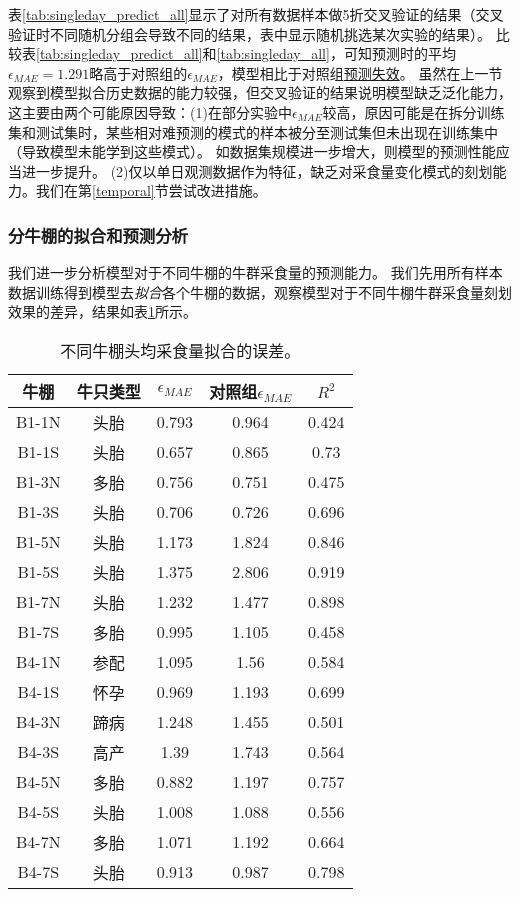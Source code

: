 表\ref{tab:singleday_predict_all}显示了对所有数据样本做5折交叉验证的结果（交叉验证时不同随机分组会导致不同的结果，表中显示随机挑选某次实验的结果）。
比较表\ref{tab:singleday_predict_all}和\ref{tab:singleday_all}，可知预测时的平均$\epsilon_{MAE}=1.291$略高于对照组的$\epsilon_{MAE}$，模型相比于对照组\uline{预测失效}。
虽然在上一节观察到模型拟合历史数据的能力较强，但交叉验证的结果说明模型缺乏泛化能力，这主要由两个可能原因导致：(1)在部分实验中$\epsilon_{MAE}$较高，原因可能是在拆分训练集和测试集时，某些相对难预测的模式的样本被分至测试集但未出现在训练集中（导致模型未能学到这些模式）。
如数据集规模进一步增大，则模型的预测性能应当进一步提升。
(2)仅以单日观测数据作为特征，缺乏对采食量变化模式的刻划能力。我们在第\ref{temporal}节尝试改进措施。



\subsubsection{分牛棚的拟合和预测分析}
\label{predict_singleday_cowshed}

我们进一步分析模型对于不同牛棚的牛群采食量的预测能力。
我们先用所有样本数据训练得到模型去\emph{拟合}各个牛棚的数据，观察模型对于不同牛棚牛群采食量刻划效果的差异，结果如表\ref{tab:regression_multicowshed}所示。

\begin{table}
\caption{不同牛棚头均采食量拟合的误差。}
\begin{center}
\footnotesize
\begin{tabular}{|c|c|c|c|c|}
\hline
	牛棚 & 牛只类型 & $\epsilon_{MAE}$ & 对照组$\epsilon_{MAE}$ &$R^2$ \\
\hline
B1-1N& 头胎 & 0.793 & 0.964 & 0.424 \\
B1-1S& 头胎 & 0.657 & 0.865 & 0.73 \\
B1-3N& 多胎 & 0.756 & 0.751 & 0.475 \\
B1-3S& 头胎 & 0.706 & 0.726 & 0.696 \\
B1-5N& 头胎 & 1.173 & 1.824 & 0.846 \\
B1-5S& 头胎 & 1.375 & 2.806 & 0.919 \\
B1-7N& 头胎 & 1.232 & 1.477 & 0.898 \\
B1-7S& 多胎 & 0.995 & 1.105 & 0.458 \\
B4-1N& 参配 & 1.095 & 1.56 & 0.584 \\
B4-1S& 怀孕 & 0.969 & 1.193 & 0.699 \\
B4-3N& 蹄病 & 1.248 & 1.455 & 0.501 \\
B4-3S& 高产 & 1.39 & 1.743 & 0.564 \\
B4-5N& 多胎 & 0.882 & 1.197 & 0.757 \\
B4-5S& 头胎 & 1.008 & 1.088 & 0.556 \\
B4-7N& 多胎 & 1.071 & 1.192 & 0.664 \\
B4-7S& 头胎 & 0.913 & 0.987 & 0.798 \\
\hline
\end{tabular}
\end{center}
\label{tab:regression_multicowshed}
\end{table}

